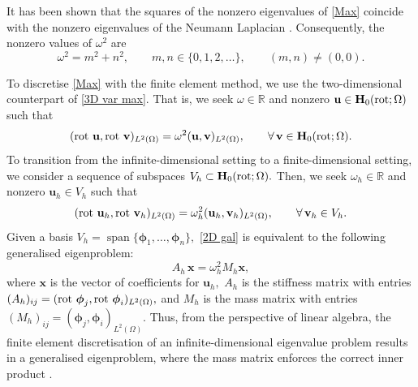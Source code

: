 
It has been shown that the squares of the nonzero eigenvalues of \eqref{Max} coincide with the nonzero eigenvalues of the Neumann Laplacian \cite[Section~5]{Boffi}. Consequently, the nonzero values of
$\omega^2$ are
\begin{equation}\label{exact eigs}
    \omega^2 = m^2+n^2,
    \qquad
    m,n\in\{0,1,2,\ldots\},
    \qquad
    (m,n)\neq(0,0).
\end{equation}

To discretise \eqref{Max} with the finite element method, we use the two-dimensional counterpart of \eqref{3D var max}. That is, we seek $\omega \in \mathbb{R}$ and nonzero $\mathbf{u} \in \mathbf{H}_0(\operatorname{rot}; \Omega)$ such that
\begin{equation} \label{2D var max}
    ( \operatorname{rot}\, \mathbf{u}, \operatorname{rot} \, \mathbf{v})_{L^2(\Omega)} = \omega^2(\mathbf{u}, \mathbf{v})_{L^2(\Omega)}, \qquad \operatorname{\forall} \mathbf{v} \in \mathbf{H}_0(\operatorname{rot}; \Omega).
\end{equation}
To transition from the infinite-dimensional setting to a finite-dimensional setting, we consider a sequence of subspaces $V_h \subset \mathbf{H}_0(\operatorname{rot}; \Omega).$ Then, we seek $\omega_h \in \mathbb{R}$ and nonzero $\mathbf{u}_h \in V_h$ such that 
\begin{equation} \label{2D gal}
    ( \operatorname{rot}\, \mathbf{u}_h, \operatorname{rot} \, \mathbf{v}_h)_{L^2(\Omega)} = \omega_h^2(\mathbf{u}_h, \mathbf{v}_h)_{L^2(\Omega)}, \qquad \operatorname{\forall} \mathbf{v}_h \in V_h.
\end{equation}
Given a basis $V_h = \operatorname{span}\{\boldsymbol{\phi}_1,\ldots,\boldsymbol{\phi}_n\},$ \eqref{2D gal} is equivalent to the following generalised eigenproblem:
\begin{equation} \label{Ax=b}
    A_h \, \mathbf{x} = \omega_h^2 M_h \mathbf{x},
\end{equation}
where $\mathbf{x}$ is the vector of coefficients for $\mathbf{u}_h,$ $A_h$ is the stiffness matrix with entries $(A_h)_{ij} = (\operatorname{rot} \, \boldsymbol{\phi}_j, \operatorname{rot} \, \boldsymbol{\phi}_i)_{L^2(\Omega)},$ and $M_h$ is the mass matrix with entries $(M_h)_{ij} = (\boldsymbol{\phi}_j, \boldsymbol{\phi}_i)_{L^2(\Omega)}.$ Thus, from the perspective of linear algebra, the finite element discretisation of an infinite-dimensional eigenvalue problem results in a generalised eigenproblem, where the mass matrix enforces the correct inner product \cite{PatrickNote}. 

